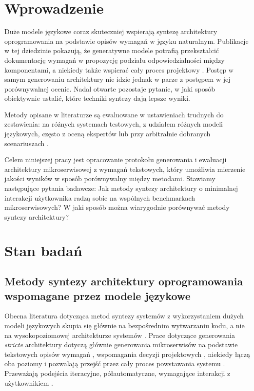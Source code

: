 \section{Wprowadzenie}

Duże modele językowe coraz skuteczniej wspierają syntezę architektury oprogramowania na podstawie opisów wymagań w języku naturalnym. Publikacje w tej dziedzinie pokazują, że generatywne modele potrafią przekształcić dokumentację wymagań w propozycję podziału odpowiedzialności między komponentami, a niekiedy także wspierać cały proces projektowy \cite{pereiraGeneratingMicroserviceArchitectures2025}. Postęp w samym generowaniu architektury nie idzie jednak w parze z postępem w jej porównywalnej ocenie. Nadal otwarte pozostaje pytanie, w jaki sposób obiektywnie ustalić, które techniki syntezy dają lepsze wyniki.

Metody opisane w literaturze są ewaluowane w ustawieniach trudnych do zestawienia: na różnych systemach testowych, z udziałem różnych modeli językowych, często z oceną ekspertów lub przy arbitralnie dobranych scenariuszach \cite{schmidSoftwareArchitectureMeets2025}.

Celem niniejszej pracy jest opracowanie protokołu generowania i ewaluacji architektury mikroserwisowej z wymagań tekstowych, który umożliwia mierzenie jakości wyników w sposób porównywalny między metodami. Stawiamy następujące pytania badawcze: Jak metody syntezy architektury o minimalnej interakcji użytkownika radzą sobie na wspólnych benchmarkach mikroserwisowych?  W jaki sposób można wiarygodnie porównywać metody syntezy architektury?

\section{Stan badań}

\subsection{Metody syntezy architektury oprogramowania wspomagane przez modele językowe}

Obecna literatura dotycząca metod syntezy systemów z wykorzystaniem dużych modeli językowych skupia się głównie na bezpośrednim wytwarzaniu kodu, a nie na wysokopoziomowej architekturze systemów \cite{schmidSoftwareArchitectureMeets2025}. Prace dotyczące generowania \emph{stricte} architektury dotyczą głównie generowania mikroserwisów na podstawie tekstowych opisów wymagań \cite{carvalhoUsefulnessAutomaticallyGenerated2024}, wspomagania decyzji projektowych \cite{eisenreichRequirementsArchitectureAIBased2024}, niekiedy łączą oba poziomy i pozwalają przejść przez cały proces powstawania systemu \cite{wei}. Przeważają podejścia iteracyjne, półautomatyczne, wymagające interakcji z użytkownikiem \cite{schmidSoftwareArchitectureMeets2025}.


